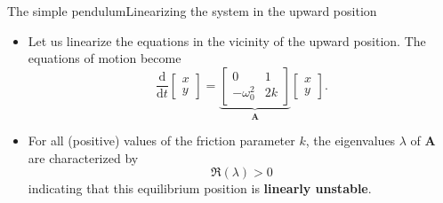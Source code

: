 \documentclass[usenames,dvipsnames,svgnames,10pt,aspectratio=169]{beamer}
\begin{document}
\begin{frame}[t, c]{The simple pendulum}{Linearizing the system in the upward position}
	\begin{minipage}{.28\textwidth}

	\end{minipage}%
	\hfill
	\begin{minipage}{.68\textwidth}
		\begin{itemize}
			\item Let us linearize the equations in the vicinity of the upward position.
			The equations of motion become
			\[
				\displaystyle \frac{\mathrm{d}}{\mathrm{d}t} \begin{bmatrix} x \\ y \end{bmatrix} = \underbrace{\begin{bmatrix} 0 & 1 \\ -\omega_0^2 & 2k \end{bmatrix}}_{\bm{A}} \begin{bmatrix} x \\ y \end{bmatrix}.
			\]

			\item For all (positive) values of the friction parameter \(k\), the eigenvalues \( \lambda \) of \( \bm{A} \) are characterized by
			\[
				\Re(\lambda) > 0
			\]
			indicating that this equilibrium position is \alert{\textbf{linearly unstable}}.
		\end{itemize}
	\end{minipage}

	\vspace{1cm}
\end{frame}
\end{document}
